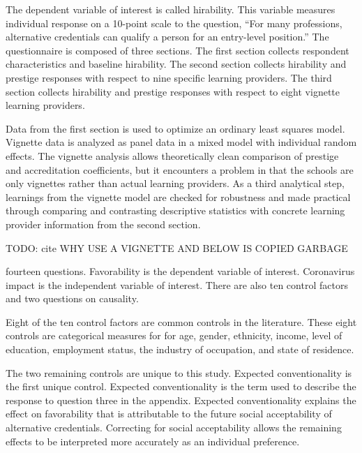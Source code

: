 \documentclass[review]{elsarticle}
\begin{document}
The dependent variable of interest is called hirability.
This variable measures individual response on a 10-point scale to the question,
``For many professions, alternative credentials can qualify a person for an entry-level position.''
The questionnaire is composed of three sections.
The first section collects respondent characteristics and baseline hirability.
The second section collects hirability and prestige responses with respect to nine specific learning providers.
The third section collects hirability and prestige responses with respect to eight vignette learning providers.

Data from the first section is used to optimize an ordinary least squares model.
Vignette data is analyzed as panel data in a mixed model with individual random effects.
The vignette analysis allows theoretically clean comparison of prestige and accreditation coefficients,
but it encounters a problem in that the schools are only vignettes rather than actual learning providers.
As a third analytical step, learnings from the vignette model are checked for robustness and made practical
through comparing and contrasting descriptive statistics with concrete learning provider information from the second section.

TODO: cite WHY USE A VIGNETTE AND BELOW IS COPIED GARBAGE

fourteen questions.
Favorability is the dependent variable of interest.
Coronavirus impact is the independent variable of interest.
There are also ten control factors and two questions on causality.

Eight of the ten control factors are common controls in the literature.
These eight controls are categorical measures for
for age, gender, ethnicity, income,
level of education, employment status, the industry of occupation, and state of residence.

The two remaining controls are unique to this study.
Expected conventionality is the first unique control.
Expected conventionality is the term used to describe the response to question three in the appendix.
Expected conventionality explains the effect on favorability that is
attributable to the future social acceptability of alternative credentials.
Correcting for social acceptability allows the remaining effects to be interpreted more accurately as an individual preference.
\end{document}
